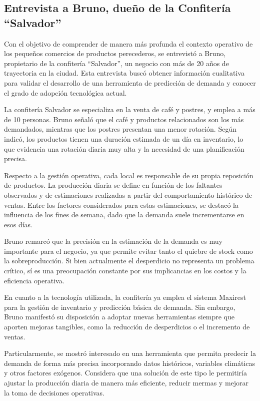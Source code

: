 \subsection{Entrevista a Bruno, dueño de la Confitería ``Salvador''}

Con el objetivo de comprender de manera más profunda el contexto operativo de los pequeños comercios de productos perecederos, se entrevistó a Bruno, propietario de la confitería ``Salvador'', un negocio con más de 20 años de trayectoria en la ciudad. Esta entrevista buscó obtener información cualitativa para validar el desarrollo de una herramienta de predicción de demanda y conocer el grado de adopción tecnológica actual.

La confitería Salvador se especializa en la venta de café y postres, y emplea a más de 10 personas. Bruno señaló que el café y productos relacionados son los más demandados, mientras que los postres presentan una menor rotación. Según indicó, los productos tienen una duración estimada de un día en inventario, lo que evidencia una rotación diaria muy alta y la necesidad de una planificación precisa.

Respecto a la gestión operativa, cada local es responsable de su propia reposición de productos. La producción diaria se define en función de los faltantes observados y de estimaciones realizadas a partir del comportamiento histórico de ventas. Entre los factores considerados para estas estimaciones, se destacó la influencia de los fines de semana, dado que la demanda suele incrementarse en esos días.

Bruno remarcó que la precisión en la estimación de la demanda es muy importante para el negocio, ya que permite evitar tanto el quiebre de stock como la sobreproducción. Si bien actualmente el desperdicio no representa un problema crítico, sí es una preocupación constante por sus implicancias en los costos y la eficiencia operativa.

En cuanto a la tecnología utilizada, la confitería ya emplea el sistema Maxirest para la gestión de inventario y predicción básica de demanda. Sin embargo, Bruno manifestó su disposición a adoptar nuevas herramientas siempre que aporten mejoras tangibles, como la reducción de desperdicios o el incremento de ventas.

Particularmente, se mostró interesado en una herramienta que permita predecir la demanda de forma más precisa incorporando datos históricos, variables climáticas y otros factores exógenos. Considera que una solución de este tipo le permitiría ajustar la producción diaria de manera más eficiente, reducir mermas y mejorar la toma de decisiones operativas.

